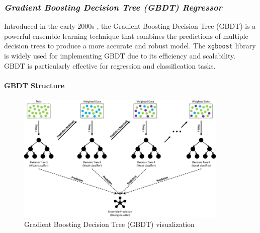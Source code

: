 \documentclass{article}
\begin{document}

\subsubsection{\emph{Gradient Boosting Decision Tree (GBDT) Regressor}}

    Introduced in the early 2000s \cite{boosting-paper}, the Gradient Boosting Decision Tree (GBDT) is a powerful ensemble learning technique that combines the predictions of multiple decision trees to produce a more accurate and robust model. The \texttt{xgboost} library is widely used for implementing GBDT due to its efficiency and scalability. GBDT is particularly effective for regression and classification tasks.

    \paragraph{GBDT Structure}
    \begin{figure}[H]
        \centering
        \includegraphics[width=0.9\textwidth]{gbdt.png}
        \caption{Gradient Boosting Decision Tree (GBDT) visualization \cite{gbdt_structure}}
        \label{fig:enter-label}
    \end{figure}
\end{document}
